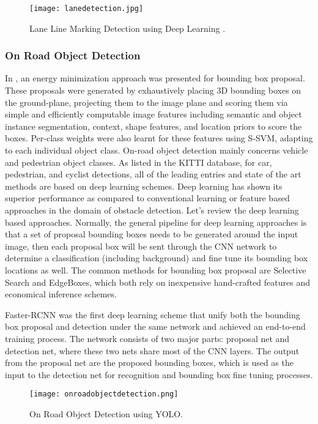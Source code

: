 \begin{figure}[h]
    \centering
    \texttt{[image: lanedetection.jpg]}
    \caption{Lane Line Marking Detection using Deep Learning \cite{road}.}
    \label{fig:lanedetection}
\end{figure}


\subsubsection{On Road Object Detection}
In \cite{vision}, an energy minimization approach was presented for bounding box
proposal. These proposals were generated by exhaustively placing 3D bounding
boxes on the ground-plane, projecting them to the image plane and scoring them
via simple and efficiently computable image features including semantic and
object instance segmentation, context, shape features, and location priors to
score the boxes. Per-class weights were also learnt for these features using
S-SVM, adapting to each individual object class. On-road object detection mainly
concerns vehicle and pedestrian object classes. As listed in the KITTI database,
for car, pedestrian, and cyclist detections, all of the leading entries and
state of the art methods are based on deep learning schemes. Deep learning has
shown its superior performance as compared to conventional learning or feature
based approaches in the domain of obstacle detection. Let's review the deep
learning based approaches. Normally, the general pipeline for deep learning
approaches is that a set of proposal bounding boxes needs to be generated around
the input image, then each proposal box will be sent through the CNN network to
determine a classification (including background) and fine tune its bounding box
locations as well. The common methods for bounding box proposal are Selective
Search and EdgeBoxes, which both rely on inexpensive hand-crafted features and
economical inference schemes.

Faster-RCNN was the first deep learning scheme that unify both the
bounding box proposal and detection under the same network and achieved an
end-to-end training process. The network consists of two major parts: proposal
net and detection net, where these two nets share most of the CNN layers. The
output from the proposal net are the proposed bounding boxes, which is used as
the input to the detection net for recognition and bounding box fine tuning
processes.

\begin{figure}[h]
    \centering
    \texttt{[image: onroadobjectdetection.png]}
    \caption{On Road Object Detection using YOLO.}
    \label{fig:onroadobjectdetection}
\end{figure}

